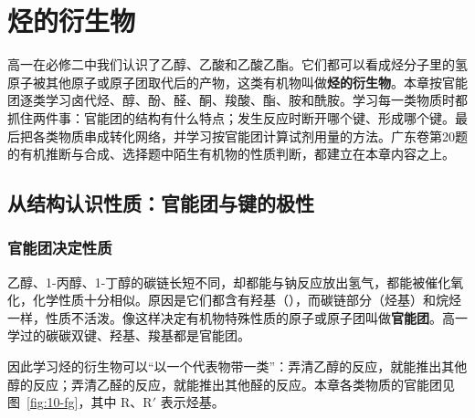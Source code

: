 \documentclass[UTF8,a4paper,zihao=5,oneside,openany,fontset=none]{ctexbook}
\begin{document}
\newcommand{\ctencut}[2]{\draw[c10cut] ($(#1)!0.5!(#2)!0.26cm!90:(#2)$)--($(#1)!0.5!(#2)!0.26cm!-90:(#2)$);}
\newcommand{\ctentube}[5]{%
  \fill[#5] (#1-0.22,#2+#4) -- (#1-0.22,#2+0.22) arc (180:360:0.22) -- (#1+0.22,#2+#4) -- cycle;
  \draw[c10glass] (#1-0.22,#2+#3) -- (#1-0.22,#2+0.22) arc (180:360:0.22) -- (#1+0.22,#2+#3);}
\newcommand{\ctenlamp}[2]{%
  \draw[c10glass,fill=black!5] (#1-0.4,#2) -- (#1+0.4,#2) -- (#1+0.28,#2+0.5) -- (#1-0.28,#2+0.5) -- cycle;
  \draw[c10glass] (#1-0.08,#2+0.5) rectangle (#1+0.08,#2+0.62);
  \fill[orange!70] (#1,#2+0.62) .. controls (#1-0.18,#2+0.8) and (#1-0.05,#2+1.0) .. (#1,#2+1.15)
    .. controls (#1+0.05,#2+1.0) and (#1+0.18,#2+0.8) .. (#1,#2+0.62);}

\chapter{烃的衍生物}

高一在必修二中我们认识了乙醇、乙酸和乙酸乙酯。它们都可以看成烃分子里的氢原子被其他原子或原子团取代后的产物，这类有机物叫做\textbf{烃的衍生物}。本章按官能团逐类学习卤代烃、醇、酚、醛、酮、羧酸、酯、胺和酰胺。学习每一类物质时都抓住两件事：官能团的结构有什么特点；发生反应时断开哪个键、形成哪个键。最后把各类物质串成转化网络，并学习按官能团计算试剂用量的方法。广东卷第20题的有机推断与合成、选择题中陌生有机物的性质判断，都建立在本章内容之上。

\section{从结构认识性质：官能团与键的极性}

\subsection{官能团决定性质}
乙醇、1-丙醇、1-丁醇的碳链长短不同，却都能与钠反应放出氢气，都能被催化氧化，化学性质十分相似。原因是它们都含有羟基（），而碳链部分（烃基）和烷烃一样，性质不活泼。像这样决定有机物特殊性质的原子或原子团叫做\textbf{官能团}。高一学过的碳碳双键、羟基、羧基都是官能团。

因此学习烃的衍生物可以“以一个代表物带一类”：弄清乙醇的反应，就能推出其他醇的反应；弄清乙醛的反应，就能推出其他醛的反应。本章各类物质的官能团见图~\ref{fig:10-fg}，其中 R、R$'$ 表示烃基。
\end{document}
